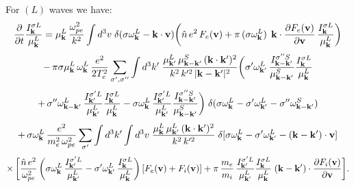 \documentclass[12pt,a4paper,ruledheader]{report}
\begin{document}
For $(L)$ waves we have:
\begin{displaymath}
\frac{\partial}{\partial t}\frac{I_{\bf k}^{\sigma L}}{\mu_{\bf k}^L}
=\mu_{\bf k}^L\,\frac{\omega_{pe}^2}{k^2}\int d^3v\;
\delta(\sigma\omega_{\bf k}^L-{\bf k}\cdot{\bf v})
\biggl(\hat{n}\,e^2\,F_e({\bf v})+\pi\,(\sigma\omega_{\bf k}^L)\,
\;{\bf k}\cdot\frac{\partial F_e({\bf v})}{\partial{\bf v}}
\,\frac{I_{\bf k}^{\sigma L}}{\mu_{\bf k}^L}\biggr)
\end{displaymath}
\begin{displaymath}
-\,\pi\sigma\mu_{\bf k}^L\,\omega_{\bf k}^L
\,\frac{e^2}{2T_e^2}\sum_{\sigma ',\sigma ''}\int d^3 k'\;
\frac{\mu_{{\bf k}'}^L\,\mu_{{\bf k}-{\bf k}'}^S
\,({\bf k}\cdot{\bf k}')^2}{k^2\,k'^2\,|{\bf k}-{\bf k}'|^2}
\biggl(\sigma '\omega_{{\bf k}'}^L\,
\frac{I_{{\bf k}-{\bf k}'}^{\sigma ''S}}{\mu_{{\bf k}-{\bf k}'}^S}
\frac{I_{\bf k}^{\sigma L}}{\mu_{\bf k}^L}
\end{displaymath}
\begin{equation}
+\,\sigma ''\omega_{{\bf k}-{\bf k}'}^L
\,\frac{I_{{\bf k}'}^{\sigma 'L}}{\mu_{{\bf k}'}^L}
\frac{I_{\bf k}^{\sigma L}}{\mu_{\bf k}^L}
-\sigma\omega_{\bf k}^L\,\frac{I_{{\bf k}'}^{\sigma 'L}}
{\mu_{{\bf k}'}^L}\frac{I_{{\bf k}-{\bf k}'}^{\sigma ''S}}
{\mu_{{\bf k}-{\bf k}'}^S}\biggr)
\;\delta(\sigma\omega_{\bf k}^L-\sigma '\omega_{{\bf k}'}^L
-\sigma ''\omega_{{\bf k}-{\bf k}'}^S)
\label{L,1}
\end{equation}
\begin{displaymath}
+\,\sigma\omega_{\bf k}^L\,\frac{e^2}{m_e^2\,\omega_{pe}^2}
\sum_{\sigma '}\int d^3 k'\int d^3v\;
\frac{\mu_{\bf k}^L\,\mu_{{\bf k}'}^L\,
({\bf k}\cdot{\bf k}')^2}{k^2\,k'^2}\;\delta[\sigma\omega_{\bf k}^L
-\sigma '\omega_{{\bf k}'}^L-({\bf k}-{\bf k}')\cdot{\bf v}]
\end{displaymath}
\begin{displaymath}
\times\,\biggl[\frac{\hat{n}\,e^2}{\omega_{pe}^2}
\,\biggl(\sigma\omega_{\bf k}^L\,\frac{I_{{\bf k}'}^{\sigma 'L}}
{\mu_{{\bf k}'}^L}
-\sigma '\omega_{{\bf k}'}^L\,
\frac{I_{\bf k}^{\sigma L}}{\mu_{\bf k}^L}
\biggr)\,[F_e({\bf v})+F_i({\bf v})]
+\pi\,\frac{m_e}{m_i}\,\frac{I_{{\bf k}'}^{\sigma 'L}}{\mu_{{\bf k}'}^L}
\frac{I_{\bf k}^{\sigma L}}{\mu_{\bf k}^L}\;({\bf k}-{\bf k}')
\cdot\frac{\partial F_i({\bf v})}{\partial{\bf v}}\biggr].
\end{displaymath}
\end{document}
